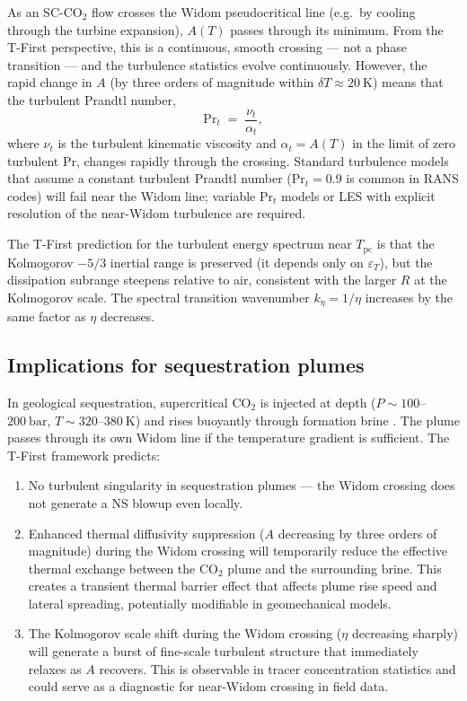 \documentclass[12pt,a4paper]{article}
\newcommand{\eps}{\varepsilon}
\newcommand{\Tc}{T_{\mathrm{pc}}}   %
\newcommand{\sco}{SC-CO$_2$}
\newcommand{\Kol}{\eta}             %
\begin{document}
As an \sco{} flow crosses the Widom pseudocritical line (e.g.\ by cooling through
the turbine expansion), $A(T)$ passes through its minimum.  From the T-First
perspective, this is a continuous, smooth crossing --- not a phase transition ---
and the turbulence statistics evolve continuously.  However, the rapid change in
$A$ (by three orders of magnitude within $\delta T \approx \SI{20}{\kelvin}$)
means that the turbulent Prandtl number,
\begin{equation}
  \mathrm{Pr}_t \;=\; \frac{\nu_t}{\alpha_t},
\end{equation}
where $\nu_t$ is the turbulent kinematic viscosity and $\alpha_t = A(T)$ in the
limit of zero turbulent $\mathrm{Pr}$, changes rapidly through the crossing.
Standard turbulence models that assume a constant turbulent Prandtl number
($\mathrm{Pr}_t = 0.9$ is common in RANS codes) will fail near the Widom line;
variable $\mathrm{Pr}_t$ models or LES with explicit resolution of the
near-Widom turbulence are required.

The T-First prediction for the turbulent energy spectrum near $\Tc$ is that the
Kolmogorov $-5/3$ inertial range is preserved (it depends only on $\eps_T$),
but the dissipation subrange steepens relative to air, consistent with the
larger $R$ at the Kolmogorov scale.  The spectral transition wavenumber
$k_\Kol = 1/\Kol$ increases by the same factor as $\Kol$ decreases.

\subsection{Implications for sequestration plumes}
\label{sec:engineering:sequestration}

In geological sequestration, supercritical CO$_2$ is injected at depth
($P \sim 100$--$\SI{200}{\bar}$, $T \sim 320$--$\SI{380}{\kelvin}$) and rises
buoyantly through formation brine \citep{Huppert2014}.  The plume passes through
its own Widom line if the temperature gradient is sufficient.  The T-First
framework predicts:
\begin{enumerate}[label=(\roman*)]
  \item No turbulent singularity in sequestration plumes --- the Widom crossing
    does not generate a NS blowup even locally.
  \item Enhanced thermal diffusivity suppression ($A$ decreasing by three orders
    of magnitude) during the Widom crossing will temporarily reduce the effective
    thermal exchange between the CO$_2$ plume and the surrounding brine.
    This creates a transient thermal barrier effect that affects plume rise speed
    and lateral spreading, potentially modifiable in geomechanical models.
  \item The Kolmogorov scale shift during the Widom crossing ($\Kol$ decreasing
    sharply) will generate a burst of fine-scale turbulent structure that
    immediately relaxes as $A$ recovers.  This is observable in tracer
    concentration statistics and could serve as a diagnostic for near-Widom
    crossing in field data.
\end{enumerate}
\end{document}

